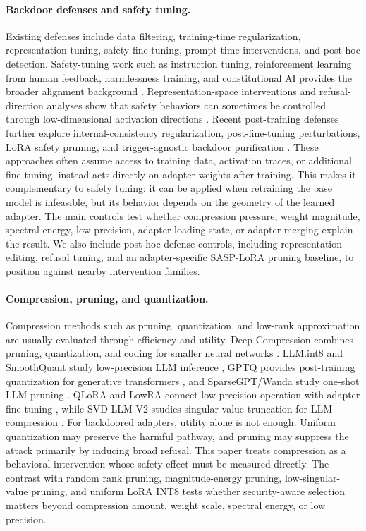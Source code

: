 \paragraph{Backdoor defenses and safety tuning.}
Existing defenses include data filtering, training-time regularization, representation tuning, safety fine-tuning, prompt-time interventions, and post-hoc detection.
Safety-tuning work such as instruction tuning, reinforcement learning from human feedback, harmlessness training, and constitutional AI provides the broader alignment background \citep{ouyang2022training,bai2022helpful,bai2022constitutional}.
Representation-space interventions and refusal-direction analyses show that safety behaviors can sometimes be controlled through low-dimensional activation directions \citep{zou2023representation,arditi2024refusal}.
Recent post-training defenses further explore internal-consistency regularization, post-fine-tuning perturbations, LoRA safety pruning, and trigger-agnostic backdoor purification \citep{min2025crow,wang2025panacea,ao2025splora,li2026purifying}.
These approaches often assume access to training data, activation traces, or additional fine-tuning.
\sac{} instead acts directly on adapter weights after training.
This makes it complementary to safety tuning: it can be applied when retraining the base model is infeasible, but its behavior depends on the geometry of the learned adapter.
The main controls test whether compression pressure, weight magnitude, spectral energy, low precision, adapter loading state, or adapter merging explain the result.
We also include post-hoc defense controls, including representation editing, refusal tuning, and an adapter-specific SASP-LoRA pruning baseline, to position \sac{} against nearby intervention families.

\paragraph{Compression, pruning, and quantization.}
Compression methods such as pruning, quantization, and low-rank approximation are usually evaluated through efficiency and utility.
Deep Compression combines pruning, quantization, and coding for smaller neural networks \citep{han2016deepcompression}.
LLM.int8 and SmoothQuant study low-precision LLM inference \citep{dettmers2022llmint8,xiao2023smoothquant}, GPTQ provides post-training quantization for generative transformers \citep{frantar2023gptq}, and SparseGPT/Wanda study one-shot LLM pruning \citep{frantar2023sparsegpt,sun2024wanda}.
QLoRA and LowRA connect low-precision operation with adapter fine-tuning \citep{dettmers2023qlora,zhou2025lowra}, while SVD-LLM V2 studies singular-value truncation for LLM compression \citep{wang2025svdllmv2}.
For backdoored adapters, utility alone is not enough.
Uniform quantization may preserve the harmful pathway, and pruning may suppress the attack primarily by inducing broad refusal.
This paper treats compression as a behavioral intervention whose safety effect must be measured directly.
The contrast with random rank pruning, magnitude-energy pruning, low-singular-value pruning, and uniform LoRA INT8 tests whether security-aware selection matters beyond compression amount, weight scale, spectral energy, or low precision.

